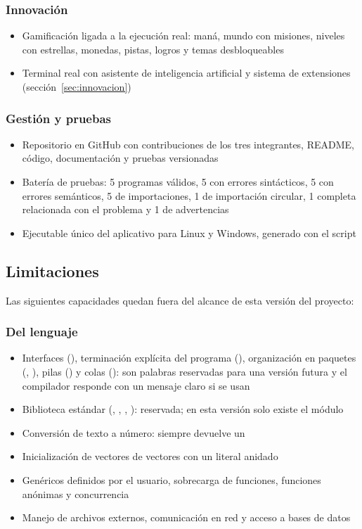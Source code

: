 \subsubsection*{Innovación}
\begin{itemize}
  \item Gamificación ligada a la ejecución real: maná, mundo con misiones, niveles con estrellas, monedas, pistas, logros y temas desbloqueables
  \item Terminal real con asistente de inteligencia artificial y sistema de extensiones (sección~\ref{sec:innovacion})
\end{itemize}

\subsubsection*{Gestión y pruebas}
\begin{itemize}
  \item Repositorio en GitHub con contribuciones de los tres integrantes, README, código, documentación y pruebas versionadas
  \item Batería de pruebas: 5 programas válidos, 5 con errores sintácticos, 5 con errores semánticos, 5 de importaciones, 1 de importación circular, 1 completa relacionada con el problema y 1 de advertencias
  \item Ejecutable único del aplicativo para Linux y Windows, generado con el script 
\end{itemize}

\subsection{Limitaciones}
\label{sec:limitaciones}

Las siguientes capacidades quedan fuera del alcance de esta versión del proyecto:

\subsubsection*{Del lenguaje}
\begin{itemize}
  \item Interfaces (), terminación explícita del programa (), organización en paquetes (, ), pilas () y colas (): son palabras reservadas para una versión futura y el compilador responde con un mensaje claro si se usan
  \item Biblioteca estándar  (, , , ): reservada; en esta versión solo existe el módulo 
  \item Conversión de texto a número:  siempre devuelve un 
  \item Inicialización de vectores de vectores con un literal anidado
  \item Genéricos definidos por el usuario, sobrecarga de funciones, funciones anónimas y concurrencia
  \item Manejo de archivos externos, comunicación en red y acceso a bases de datos
\end{itemize}

